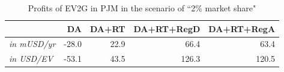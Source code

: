\begin{table}[h!]
	\footnotesize
	\centering
	\begin{tabular}{l r r r r}%
		\hline
		& DA & DA+RT & DA+RT+RegD & DA+RT+RegA \\
		\hline
		\textit{in mUSD/yr}&    -28.0 	& 22.9& 	 66.4 &	 63.4  \\
		\textit{in USD/EV} &      -53.1 &	 43.5 	& 126.3 &	 120.5    \\ 
		\hline
	\end{tabular}
\caption{Profits of EV2G in PJM in the scenario of ``2\% market share"}\label{tab:PJM-EV-profit}
\end{table}












